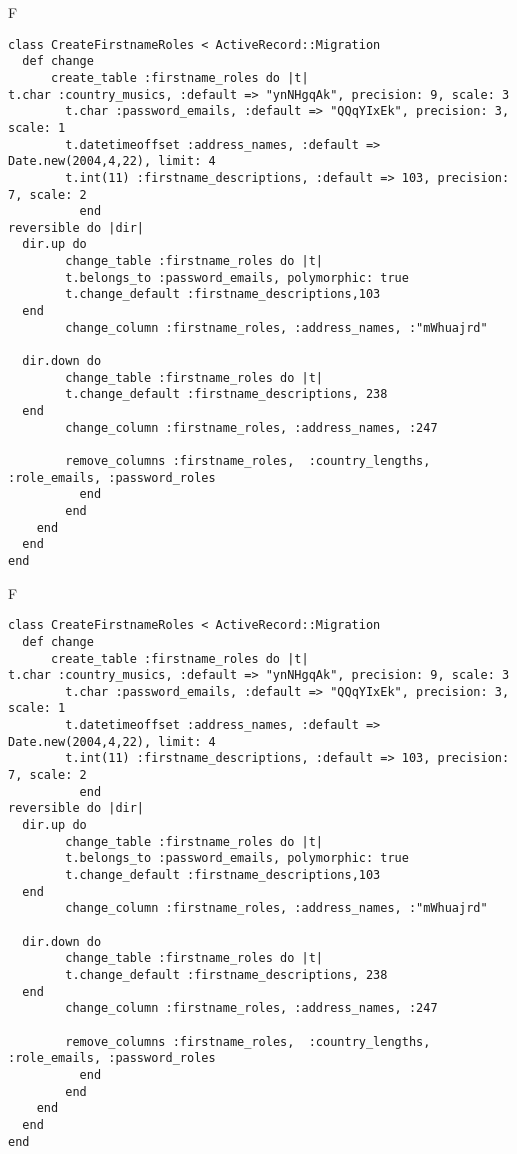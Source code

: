 F
\begin{verbatim}
class CreateFirstnameRoles < ActiveRecord::Migration
  def change
	  create_table :firstname_roles do |t|
t.char :country_musics, :default => "ynNHgqAk", precision: 9, scale: 3
		t.char :password_emails, :default => "QQqYIxEk", precision: 3, scale: 1
		t.datetimeoffset :address_names, :default => Date.new(2004,4,22), limit: 4
		t.int(11) :firstname_descriptions, :default => 103, precision: 7, scale: 2
		  end
reversible do |dir|
  dir.up do
		change_table :firstname_roles do |t|
		t.belongs_to :password_emails, polymorphic: true
 		t.change_default :firstname_descriptions,103
  end
 		change_column :firstname_roles, :address_names, :"mWhuajrd"
   
  dir.down do
		change_table :firstname_roles do |t|
		t.change_default :firstname_descriptions, 238
  end
 		change_column :firstname_roles, :address_names, :247
   
		remove_columns :firstname_roles,  :country_lengths, :role_emails, :password_roles 
	      end
	    end
    end 
  end
end

\end{verbatim}

F
\begin{verbatim}
class CreateFirstnameRoles < ActiveRecord::Migration
  def change
	  create_table :firstname_roles do |t|
t.char :country_musics, :default => "ynNHgqAk", precision: 9, scale: 3
		t.char :password_emails, :default => "QQqYIxEk", precision: 3, scale: 1
		t.datetimeoffset :address_names, :default => Date.new(2004,4,22), limit: 4
		t.int(11) :firstname_descriptions, :default => 103, precision: 7, scale: 2
		  end
reversible do |dir|
  dir.up do
		change_table :firstname_roles do |t|
		t.belongs_to :password_emails, polymorphic: true
 		t.change_default :firstname_descriptions,103
  end
 		change_column :firstname_roles, :address_names, :"mWhuajrd"
   
  dir.down do
		change_table :firstname_roles do |t|
		t.change_default :firstname_descriptions, 238
  end
 		change_column :firstname_roles, :address_names, :247
   
		remove_columns :firstname_roles,  :country_lengths, :role_emails, :password_roles 
	      end
	    end
    end 
  end
end

\end{verbatim}

